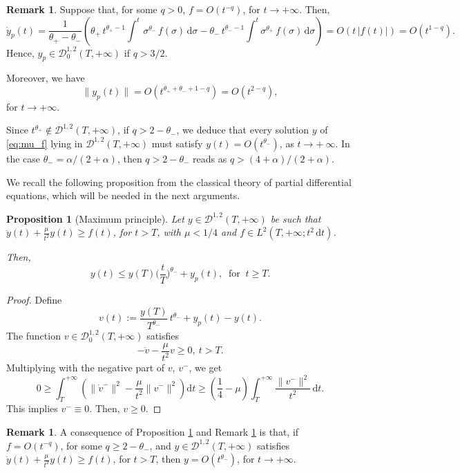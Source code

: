 \documentclass[a4paper,10pt]{amsart}
\newcommand{\ud}{\mathrm{d}}
\theoremstyle{plain}
\newtheorem{prop}[thm]{Proposition}
\theoremstyle{definition}
\newtheorem{rem}[thm]{Remark}
\numberwithin{equation}{section}
\numberwithin{thm}{section}
\begin{document}
\begin{rem}
\label{rem:f_gamma}
    Suppose that, for some $q>0$, $f=O(t^{-q})$, for $t\rightarrow+\infty$. Then,
    \[
    \dot y_p(t)=\frac{1}{\theta_+-\theta_-}\left(\theta_+\,t^{\theta_+-1}\int^t\,\sigma^{\theta_-}\,f(\sigma)\,\ud\sigma - \theta_- \, t^{\theta_--1}\int^t \sigma^{\theta_+}\,f(\sigma)\,\ud\sigma\right) =O(t\,|f(t)|)=O(t^{1-q}).
    \]
    Hence, $y_p \in \mathcal{D}_0^{1,2}(T,+\infty)$ if $q>3/2$. 
    
    Moreover, we have  
    \[
    \|y_p(t)\|= O(t^{{\theta_+}+{\theta_-}+1-q})=O(t^{2-q}),
    \]
    for $t\rightarrow+\infty$.

    Since $t^{\theta_+} \notin \mathcal{D}^{1,2}(T,+\infty)$, if $q > 2-\theta_-$, we deduce that every solution $y$ of \eqref{eq:mu_f} lying in $\mathcal{D}^{1,2}(T,+\infty)$ must satisfy $y(t)=O(t^{\theta_-})$, as $t\to+\ \infty$. In the case $\theta_-=\alpha/(2+\alpha)$, then $q > 2-\theta_-$ reads as $q > (4+\alpha)/(2+\alpha)$.
\end{rem}

We recall the following proposition from the classical theory of partial differential equations, which will be needed in the next arguments.  
\begin{prop}[Maximum principle]\label{prop:max_principle}
Let $y\in\mathcal{D}^{1,2}(T,+\infty)$ be such that $
\ddot{y}(t) + \frac{\mu}{t^2}y(t) \ge f(t)$, for  $t>T$, with $\mu <1/4$ and $f \in L^2(T,+\infty;t^2\,\ud t)$.

Then,
\[
y(t) \le y(T)\bigg(\frac{t}{T}\bigg)^{\theta_-} + y_p(t), \ \mbox{ for } \ t\ge T.
\]
\end{prop}
\begin{proof}
    Define
    \[
    v(t) := \frac{y(T)}{T^{\theta_-}}\,t^{\theta_-}+y_p(t) - y(t).
    \]
    The function $v \in \mathcal{D}^{1,2}_0(T,+\infty)$  satisfies
    \[
    -\ddot{v}- \frac{\mu}{t^2}v \ge 0, \ t>T.
    \]
   Multiplying with the negative part of $v$, $v^-$, we get
    \[
    0\ge 
    \int_{T}^{+\infty} \left(\|\dot v^-\|^2 - \frac{\mu}{t^2}\|v^-\|^2\right) \ud t \ge \left(\frac14 -\mu\right)\int_T^{+\infty} \frac{\|v^-\|^2}{t^2}\,\ud t.
    \]
    This implies $v^-\equiv 0$. Then, $v\ge0$.
\end{proof}

\begin{rem}
\label{rem:corollary}
    A consequence of Proposition \ref{prop:max_principle} and Remark \ref{rem:f_gamma} is that, if $f=O(t^{-q})$, for some $q \ge 2-\theta_-$, and $y\in \mathcal{D}^{1,2}(T,+\infty)$ satisfies $\ddot y(t)+\frac{\mu}{t^2}y(t)\ge f(t)$, for $t >T$, then $y=O(t^{\theta_-})$, for $t\rightarrow+\infty$.
\end{rem}
\end{document}

